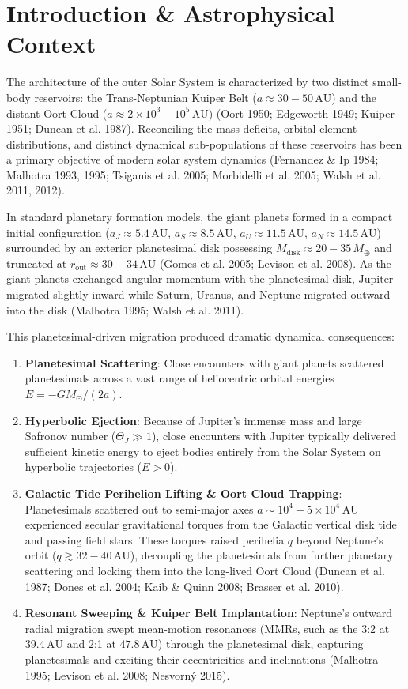 \documentclass[11pt,a4paper]{article}
\begin{document}
\section{Introduction \& Astrophysical Context}
The architecture of the outer Solar System is characterized by two distinct small-body reservoirs: the Trans-Neptunian Kuiper Belt ($a \approx 30 - 50\,\text{AU}$) and the distant Oort Cloud ($a \approx 2\times 10^3 - 10^5\,\text{AU}$) (Oort 1950; Edgeworth 1949; Kuiper 1951; Duncan et al. 1987). Reconciling the mass deficits, orbital element distributions, and distinct dynamical sub-populations of these reservoirs has been a primary objective of modern solar system dynamics (Fernandez \& Ip 1984; Malhotra 1993, 1995; Tsiganis et al. 2005; Morbidelli et al. 2005; Walsh et al. 2011, 2012).

In standard planetary formation models, the giant planets formed in a compact initial configuration ($a_J \approx 5.4\,\text{AU}$, $a_S \approx 8.5\,\text{AU}$, $a_U \approx 11.5\,\text{AU}$, $a_N \approx 14.5\,\text{AU}$) surrounded by an exterior planetesimal disk possessing $M_{\text{disk}} \approx 20 - 35\,M_\oplus$ and truncated at $r_{\text{out}} \approx 30 - 34\,\text{AU}$ (Gomes et al. 2005; Levison et al. 2008). As the giant planets exchanged angular momentum with the planetesimal disk, Jupiter migrated slightly inward while Saturn, Uranus, and Neptune migrated outward into the disk (Malhotra 1995; Walsh et al. 2011).

This planetesimal-driven migration produced dramatic dynamical consequences:
\begin{enumerate}
    \item \textbf{Planetesimal Scattering}: Close encounters with giant planets scattered planetesimals across a vast range of heliocentric orbital energies $E = -G M_\odot / (2a)$.
    \item \textbf{Hyperbolic Ejection}: Because of Jupiter's immense mass and large Safronov number ($\Theta_J \gg 1$), close encounters with Jupiter typically delivered sufficient kinetic energy to eject bodies entirely from the Solar System on hyperbolic trajectories ($E > 0$).
    \item \textbf{Galactic Tide Perihelion Lifting \& Oort Cloud Trapping}: Planetesimals scattered out to semi-major axes $a \sim 10^4 - 5\times 10^4\,\text{AU}$ experienced secular gravitational torques from the Galactic vertical disk tide and passing field stars. These torques raised perihelia $q$ beyond Neptune's orbit ($q \gtrsim 32 - 40\,\text{AU}$), decoupling the planetesimals from further planetary scattering and locking them into the long-lived Oort Cloud (Duncan et al. 1987; Dones et al. 2004; Kaib \& Quinn 2008; Brasser et al. 2010).
    \item \textbf{Resonant Sweeping \& Kuiper Belt Implantation}: Neptune's outward radial migration swept mean-motion resonances (MMRs, such as the 3:2 at $39.4\,\text{AU}$ and 2:1 at $47.8\,\text{AU}$) through the planetesimal disk, capturing planetesimals and exciting their eccentricities and inclinations (Malhotra 1995; Levison et al. 2008; Nesvorn{\'y} 2015).
\end{enumerate}
\end{document}
